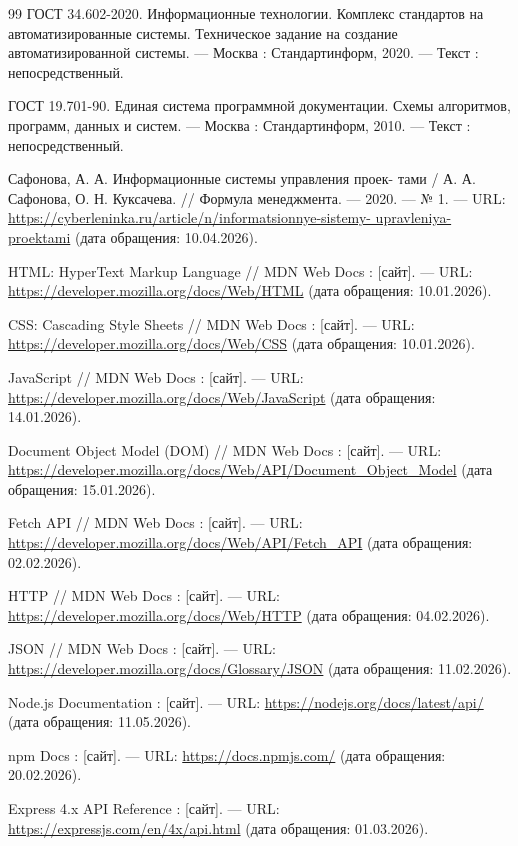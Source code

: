 \begin{thebibliography}{99}
	 ГОСТ 34.602-2020. Информационные технологии. Комплекс стандартов на автоматизированные системы. Техническое задание на создание автоматизированной системы. --- Москва : Стандартинформ, 2020. --- Текст : непосредственный.
	
	 ГОСТ 19.701-90. Единая система программной документации. Схемы алгоритмов, программ, данных и систем. --- Москва : Стандартинформ, 2010. --- Текст : непосредственный.
	
	 Сафонова, А. А. Информационные системы управления проек-
	тами / А. А. Сафонова, О. Н. Куксачева. // Формула менеджмента. ---
	2020. --- № 1. --- URL: \url{https://cyberleninka.ru/article/n/informatsionnye-sistemy-
	upravleniya-proektami} (дата обращения: 10.04.2026).
	
	 HTML: HyperText Markup Language // MDN Web Docs : [сайт]. --- URL: \url{https://developer.mozilla.org/docs/Web/HTML} (дата обращения: 10.01.2026).
	
	 CSS: Cascading Style Sheets // MDN Web Docs : [сайт]. --- URL: \url{https://developer.mozilla.org/docs/Web/CSS} (дата обращения: 10.01.2026).
	
	 JavaScript // MDN Web Docs : [сайт]. --- URL: \url{https://developer.mozilla.org/docs/Web/JavaScript} (дата обращения: 14.01.2026).
	
	 Document Object Model (DOM) // MDN Web Docs : [сайт]. --- URL: \url{https://developer.mozilla.org/docs/Web/API/Document_Object_Model} (дата обращения: 15.01.2026).
	
	 Fetch API // MDN Web Docs : [сайт]. --- URL: \url{https://developer.mozilla.org/docs/Web/API/Fetch_API} (дата обращения: 02.02.2026).
	
	 HTTP // MDN Web Docs : [сайт]. --- URL: \url{https://developer.mozilla.org/docs/Web/HTTP} (дата обращения: 04.02.2026).
	
	 JSON // MDN Web Docs : [сайт]. --- URL: \url{https://developer.mozilla.org/docs/Glossary/JSON} (дата обращения: 11.02.2026).
	
	 Node.js Documentation : [сайт]. --- URL: \url{https://nodejs.org/docs/latest/api/} (дата обращения: 11.05.2026).
	
	 npm Docs : [сайт]. --- URL: \url{https://docs.npmjs.com/} (дата обращения: 20.02.2026).
	
	 Express 4.x API Reference : [сайт]. --- URL: \url{https://expressjs.com/en/4x/api.html} (дата обращения: 01.03.2026).
	

\end{thebibliography}
